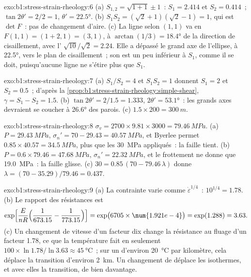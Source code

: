 \begin{solution}{exo:b1:stress-strain-rheology:6}
(a) $S_{1,2} = \sqrt{1 + 1} \pm 1$~: $S_1 = 2.414$ et $S_2 = 0.414$~;
$\tan2\theta' = 2/2 = 1$, $\theta' = \ang{22.5}$. (b) $S_1S_2 =
(\sqrt2 + 1)(\sqrt2 - 1) = 1$, qui est $\det F$~: pas de changement d'aire. (c) La
ligne selon $(1, 1)$ va en $F(1, 1) = (1 + 2, 1) = (3, 1)$, à
$\arctan(1/3) = \ang{18.4}$ de la direction de cisaillement, avec l'
$\sqrt{10}/\sqrt2 = 2.24$. Elle a dépassé le grand axe de l'ellipse,
à \ang{22.5}, vers le plan de cisaillement~; son  est un peu inférieur à
$S_1$, comme il se doit, puisqu'aucune ligne ne s'étire plus que $S_1$.
\end{solution}

\begin{solution}{exo:b1:stress-strain-rheology:7}
(a) $S_1/S_2 = 4$ et $S_1S_2 = 1$ donnent $S_1 = 2$ et $S_2 = 0.5$~; d'après la
\cref{prop:b1:stress-strain-rheology:simple-shear}, $\gamma = S_1 - S_2 =
1.5$. (b) $\tan2\theta' = 2/1.5 = 1.333$, $2\theta' = \ang{53.1}$~: les grands
axes devraient se coucher à \ang{26.6} des parois. (c) $1.5\times200 = \qty{300}{m}$.
\end{solution}

\begin{solution}{exo:b1:stress-strain-rheology:8}
$\sigma_v = 2700\times9.81\times3000 = \qty{79.46}{MPa}$. (a) $P = \qty{29.43}{MPa}$,
$\sigma_n' = 70 - 29.43 = \qty{40.57}{MPa}$, et Byerlee permet
$0.85\times40.57 = \qty{34.5}{MPa}$, plus que les \qty{30}{MPa} appliqués~: la
faille tient. (b) $P = 0.6\times79.46 = \qty{47.68}{MPa}$, $\sigma_n' =
\qty{22.32}{MPa}$, et le frottement ne donne que \qty{19.0}{MPa}~: la faille
glisse. (c) $30 = 0.85\,(70 - 79.46\,\lambda)$ donne $\lambda = (70 -
35.29)/79.46 = 0.437$.
\end{solution}

\begin{solution}{exo:b1:stress-strain-rheology:9}
(a) La contrainte varie comme $\dot\varepsilon^{1/4}$~: $10^{1/4} = 1.78$. (b) Le
rapport des résistances est
\[
  \exp\Bigl[\frac{E}{nR}\Bigl(\frac{1}{673.15} - \frac{1}{773.15}\Bigr)\Bigr]
  = \exp\bigl(6705\times\num{1.921e-4}\bigr) = \exp(1.288) = 3.63 .
\]
(c) Un changement de vitesse d'un facteur dix change la résistance au fluage d'un facteur 1.78,
ce que la température fait en seulement $100\times\ln1.78/\ln3.63 \approx
\qty{45}{\degreeCelsius}$~; sur un  d'environ \qty{20}{\degreeCelsius}
par kilomètre, cela déplace la transition d'environ \qty{2}{km}. Un changement de
 déplace les isothermes, et avec elles la transition, de bien davantage.
\end{solution}

